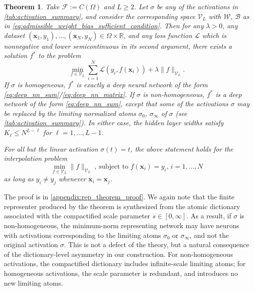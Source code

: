 \documentclass{article}
\def\vx{{\bm{x}}}
\def\cB{{\mathcal{B}}}
\def\cF{{\mathcal{F}}}
\def\cL{{\mathcal{L}}}
\def\cV{{\mathcal{V}}}
\def\cW{{\mathcal{W}}}
\newcommand{\R}{\mathbb{R}}
\newtheorem{theorem}{Theorem}[section]
\begin{document}
\begin{theorem} \label{th:rep_theorem}
    Take $\cF := C(\Omega)$ and $L \geq 2$. Let $\sigma$ be any of the activations in \cref{tab:activation_summary}, and consider the corresponding space $\cV_L$ with $\cW$, $\cB$ as in \eqref{eq:admissible_weight_bias_sufficient_condition}. Then for any $\lambda > 0$, any dataset $(\vx_1, y_1), \dots, (\vx_N, y_N) \in \Omega \times \R$, and any loss function $\cL$ which is nonnegative and lower semicontinuous in its second argument, there exists a solution $f^*$ to the problem
    \begin{equation} \label{opt:reg_loss}
        \min_{f \in \cV_L} \sum_{i=1}^N \cL(y_i, f(\vx_i)) + \lambda \| f \|_{\cV_L}.
    \end{equation}
    If $\sigma$ is homogeneous, $f^*$ is exactly a deep neural network of the form \eqref{eq:deep_nn_sum}/\eqref{eq:deep_nn_matrix}. If $\sigma$ is non-homogeneous, $f^*$ is a deep network of the form \eqref{eq:deep_nn_sum}, except that some of the activations $\sigma$ may be replaced by the limiting normalized atoms $\sigma_0$, $\sigma_\infty$ of $\sigma$ (see \cref{tab:activation_summary}). In either case, the hidden layer widths satisfy $K_{\ell} \leq N^{L-\ell}$ for $\ell = 1, \dots, L-1$. 
    
    For all but the linear activation $\sigma(t) = t$, the above statement holds for the interpolation problem
    \begin{equation} \label{opt:interp}
     \min_{f \in \cV_L} \| f \|_{\cV_L} \ , \ \mbox{subject to } f(\vx_i)=y_i, \,i=1,\dots,N
    \end{equation}
    as long as $y_i \neq y_j$ whenever $\vx_i = \vx_j$.
\end{theorem}


The proof is in \cref{appendix:rep_theorem_proof}. We again note that the finite representer produced by the theorem is synthesized from the
atomic dictionary associated with the compactified scale parameter $s \in [0,\infty]$. As a result, if $\sigma$ is non-homogeneous, the minimum-norm representing network may have neurons with activations corresponding to the limiting atoms $\sigma_0$ or $\sigma_\infty$, and not the original activation $\sigma$. This is not a defect of the theory, but a natural consequence of the dictionary-level
asymmetry in our construction. For non-homogeneous activations, the compactified dictionary includes
infinite-scale limiting atoms; for homogeneous activations, the scale parameter is
redundant, and introduces no new limiting atoms.
\end{document}
